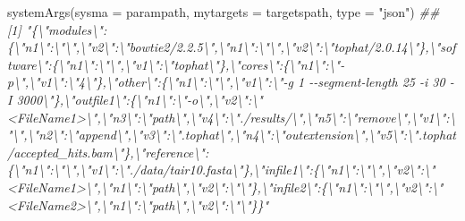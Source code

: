 \documentclass[14pt,]{article}
\newcommand{\hlstr}[1]{\textcolor[rgb]{0.251,0.627,0.251}{#1}}%
\newcommand{\hlcom}[1]{\textcolor[rgb]{0.502,0.502,0.502}{\textit{#1}}}%
\newcommand{\hlstd}[1]{\textcolor[rgb]{0.251,0.251,0.251}{#1}}%
\newenvironment{Shaded}{\begin{myshaded}}{\end{myshaded}}
\newcommand{\StringTok}[1]{\hlstr{#1}}
\newcommand{\DocumentationTok}[1]{\hlcom{#1}}
\newcommand{\FunctionTok}[1]{\hlstd{#1}}
\newcommand{\AttributeTok}[1]{{#1}}
\newcommand{\NormalTok}[1]{\hlstd{#1}}
\begin{document}
\begin{Shaded}
\begin{Highlighting}[]
\FunctionTok{systemArgs}\NormalTok{(}\AttributeTok{sysma =}\NormalTok{ parampath, }\AttributeTok{mytargets =}\NormalTok{ targetspath, }\AttributeTok{type =} \StringTok{"json"}\NormalTok{)}
\DocumentationTok{\#\# [1] "\{\textbackslash{}"modules\textbackslash{}":\{\textbackslash{}"n1\textbackslash{}":\textbackslash{}"\textbackslash{}",\textbackslash{}"v2\textbackslash{}":\textbackslash{}"bowtie2/2.2.5\textbackslash{}",\textbackslash{}"n1\textbackslash{}":\textbackslash{}"\textbackslash{}",\textbackslash{}"v2\textbackslash{}":\textbackslash{}"tophat/2.0.14\textbackslash{}"\},\textbackslash{}"software\textbackslash{}":\{\textbackslash{}"n1\textbackslash{}":\textbackslash{}"\textbackslash{}",\textbackslash{}"v1\textbackslash{}":\textbackslash{}"tophat\textbackslash{}"\},\textbackslash{}"cores\textbackslash{}":\{\textbackslash{}"n1\textbackslash{}":\textbackslash{}"{-}p\textbackslash{}",\textbackslash{}"v1\textbackslash{}":\textbackslash{}"4\textbackslash{}"\},\textbackslash{}"other\textbackslash{}":\{\textbackslash{}"n1\textbackslash{}":\textbackslash{}"\textbackslash{}",\textbackslash{}"v1\textbackslash{}":\textbackslash{}"{-}g 1 {-}{-}segment{-}length 25 {-}i 30 {-}I 3000\textbackslash{}"\},\textbackslash{}"outfile1\textbackslash{}":\{\textbackslash{}"n1\textbackslash{}":\textbackslash{}"{-}o\textbackslash{}",\textbackslash{}"v2\textbackslash{}":\textbackslash{}"\textless{}FileName1\textgreater{}\textbackslash{}",\textbackslash{}"n3\textbackslash{}":\textbackslash{}"path\textbackslash{}",\textbackslash{}"v4\textbackslash{}":\textbackslash{}"./results/\textbackslash{}",\textbackslash{}"n5\textbackslash{}":\textbackslash{}"remove\textbackslash{}",\textbackslash{}"v1\textbackslash{}":\textbackslash{}"\textbackslash{}",\textbackslash{}"n2\textbackslash{}":\textbackslash{}"append\textbackslash{}",\textbackslash{}"v3\textbackslash{}":\textbackslash{}".tophat\textbackslash{}",\textbackslash{}"n4\textbackslash{}":\textbackslash{}"outextension\textbackslash{}",\textbackslash{}"v5\textbackslash{}":\textbackslash{}".tophat/accepted\_hits.bam\textbackslash{}"\},\textbackslash{}"reference\textbackslash{}":\{\textbackslash{}"n1\textbackslash{}":\textbackslash{}"\textbackslash{}",\textbackslash{}"v1\textbackslash{}":\textbackslash{}"./data/tair10.fasta\textbackslash{}"\},\textbackslash{}"infile1\textbackslash{}":\{\textbackslash{}"n1\textbackslash{}":\textbackslash{}"\textbackslash{}",\textbackslash{}"v2\textbackslash{}":\textbackslash{}"\textless{}FileName1\textgreater{}\textbackslash{}",\textbackslash{}"n1\textbackslash{}":\textbackslash{}"path\textbackslash{}",\textbackslash{}"v2\textbackslash{}":\textbackslash{}"\textbackslash{}"\},\textbackslash{}"infile2\textbackslash{}":\{\textbackslash{}"n1\textbackslash{}":\textbackslash{}"\textbackslash{}",\textbackslash{}"v2\textbackslash{}":\textbackslash{}"\textless{}FileName2\textgreater{}\textbackslash{}",\textbackslash{}"n1\textbackslash{}":\textbackslash{}"path\textbackslash{}",\textbackslash{}"v2\textbackslash{}":\textbackslash{}"\textbackslash{}"\}\}"}
\end{Highlighting}
\end{Shaded}
\end{document}
